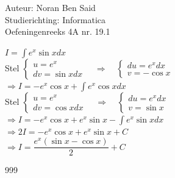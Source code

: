 \documentclass[a4paper]{article}
\begin{document}
  
\noindent \large Auteur: Noran Ben Said \\
\noindent \large Studierichting: Informatica\\
\noindent \large Oefeningenreeks 4A nr. 19.1\\

\medskip

\normalsize

$ I= \displaystyle\int e^x \sin x  dx $ \\

Stel
$
\left\{
  \begin{array}{l}
    u = e^x \\
    dv = \sin x  dx
  \end{array}
\right.
\quad \Rightarrow \quad
\left\{
  \begin{array}{l}
    du = e^x  dx \\
    v = -\cos x
  \end{array}
\right.
$ \\


$ \Rightarrow  I= -e^x \cos x + \displaystyle\int e^x \cos x  dx $ \\

Stel 
$
\left\{
  \begin{array}{l}
    u = e^x \\
    dv = \cos x  dx
  \end{array}
\right.
\quad \Rightarrow \quad
\left\{
  \begin{array}{l}
    du = e^x  dx \\
    v = \sin x
  \end{array}
\right.
$ \\

$ \Rightarrow I=-e^x \cos x + e^x \sin x - \displaystyle\int e^x \sin x  dx $ \\

$ \Rightarrow 2I = -e^x \cos x + e^x \sin x + C $ \\

$\Rightarrow I = \dfrac{e^x (\sin x - \cos x)}{2} + C $ \\

\begin{thebibliography}{999}
\end{thebibliography}
\end{document}
